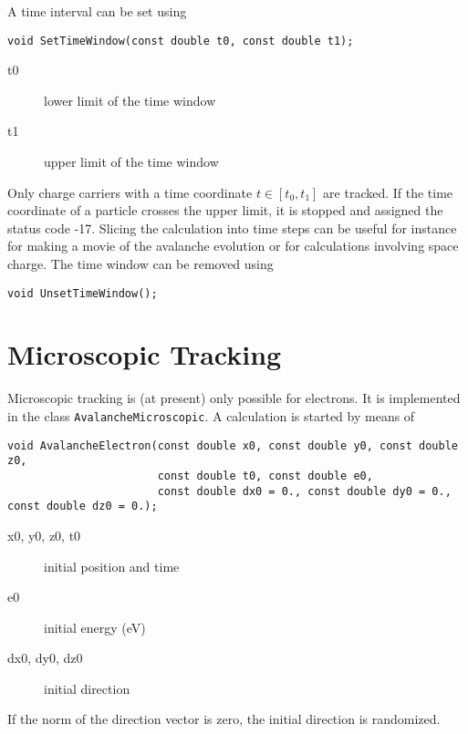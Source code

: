 A time interval can be set using
\begin{lstlisting}
void SetTimeWindow(const double t0, const double t1);
\end{lstlisting}
\begin{description}
  \item[t0] lower limit of the time window
  \item[t1] upper limit of the time window 
\end{description}
Only charge carriers with a time coordinate \(t \in \left[t_{0}, t_{1}\right]\) 
are tracked. If the time coordinate of a particle crosses the upper limit, 
it is stopped and assigned the status code -17.
Slicing the calculation into time steps can be useful for instance 
for making a movie of the avalanche evolution 
or for calculations involving space charge.
The time window can be removed using
\begin{lstlisting}
void UnsetTimeWindow();
\end{lstlisting}
 
\section{Microscopic Tracking}\label{Sec:MicroscopicTracking}
Microscopic tracking is (at present) only possible for electrons. 
It is implemented in the class \texttt{AvalancheMicroscopic}. 
A calculation is started by means of
\begin{lstlisting}
void AvalancheElectron(const double x0, const double y0, const double z0,
                       const double t0, const double e0,
                       const double dx0 = 0., const double dy0 = 0., const double dz0 = 0.);
\end{lstlisting}
\begin{description}
  \item[x0, y0, z0, t0] initial position and time
  \item[e0] initial energy (eV)
  \item[dx0, dy0, dz0] initial direction 
\end{description}
If the norm of the direction vector is zero, 
the initial direction is randomized.

